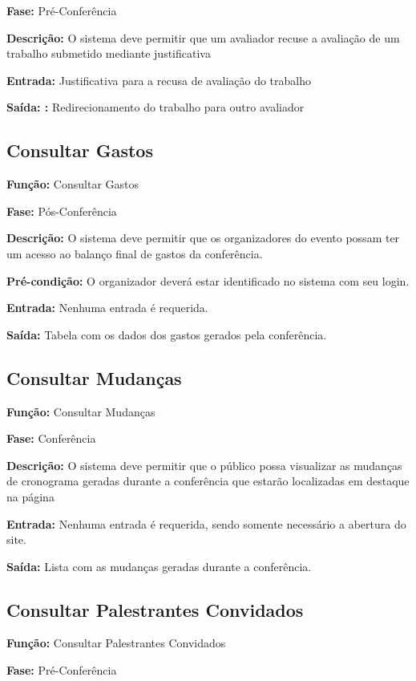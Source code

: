 \documentclass[letter]{article}
\begin{document}
\textbf{Fase: } Pré-Conferência

\textbf{Descrição: } O sistema deve permitir que um avaliador recuse a avaliação de um trabalho submetido mediante justificativa

\textbf{Entrada: } Justificativa para a recusa de avaliação do trabalho

\textbf{Saída: :} Redirecionamento do trabalho para outro avaliador




\subsection{Consultar Gastos}
\textbf{Função:}  Consultar Gastos

\textbf{Fase:}  Pós-Conferência

\textbf{Descrição: } O sistema deve permitir que os organizadores do evento possam ter um acesso ao balanço final de gastos da conferência.

\textbf{Pré-condição:}  O organizador deverá estar identificado no sistema com seu login.

\textbf{Entrada: } Nenhuma entrada é requerida.

\textbf{Saída:}  Tabela com os dados dos gastos gerados pela conferência.

\subsection{Consultar Mudanças}

\textbf{Função:}  Consultar Mudanças

\textbf{Fase:}  Conferência

\textbf{Descrição:}  O sistema deve permitir que o público possa visualizar as mudanças de cronograma geradas durante a conferência que estarão localizadas em destaque na página

\textbf{Entrada:}  Nenhuma entrada é requerida, sendo somente necessário a abertura do site.

\textbf{Saída:}  Lista com as mudanças geradas durante a conferência.

\subsection{Consultar Palestrantes Convidados}

\textbf{Função:}  Consultar Palestrantes Convidados

\textbf{Fase:}  Pré-Conferência
\end{document}
